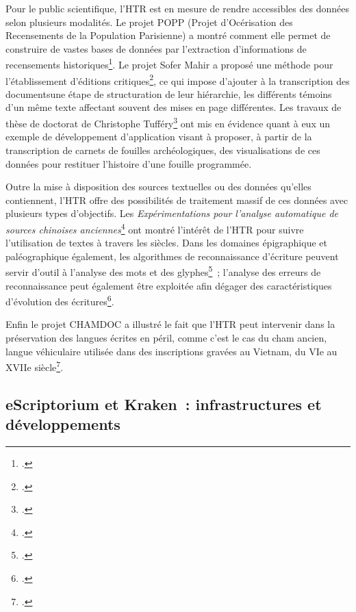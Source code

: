 \documentclass[a4paper,12pt,twoside]{book}
\begin{document}
				Pour le public scientifique, l'HTR est en mesure de rendre accessibles
				des données selon plusieurs modalités. Le projet POPP (Projet
				d'Océrisation des Recensements de la Population Parisienne) a montré
				comment elle permet de construire de vastes bases de données par
				l'extraction d'informations de recensements historiques\footcite{constumReconnaissanceExtractionInformations2022}. Le projet Sofer
				Mahir a proposé une méthode pour l'établissement d'éditions critiques\footcite{stoklbenezraHTRCriticalEdition2022}, ce qui impose d'ajouter à la
				transcription des documentsune étape de structuration de leur
				hiérarchie, les différents témoins d'un même texte affectant souvent des
				mises en page différentes. Les travaux de thèse de doctorat de
				Christophe Tufféry\footcite{tufferyRetourExperiencesUtilisation2022} ont
				mis en évidence quant à eux un exemple de développement d'application
				visant à proposer, à partir de la transcription de carnets de fouilles
				archéologiques, des visualisations de ces données pour restituer
				l'histoire d'une fouille programmée.
				
				Outre la mise à disposition des sources textuelles ou des données
				qu'elles contiennent, l'HTR offre des possibilités de traitement massif
				de ces données avec plusieurs types d'objectifs. Les
				\textit{Expérimentations pour l'analyse automatique de sources chinoises anciennes}\footcite{bizais-lilligExperimentationsPourAnalyse2022} ont
				montré l'intérêt de l'HTR pour suivre l'utilisation de textes à travers
				les siècles. Dans les domaines épigraphique et paléographique également,
				les algorithmes de reconnaissance d'écriture peuvent servir d'outil à
				l'analyse des mots et des glyphes\footcite{boschettiEpiSearchRecognisingAncient2022}~; l'analyse des erreurs de reconnaissance peut également être exploitée afin dégager des
				caractéristiques d'évolution des écritures\footcite{paraskeviHTRHandwrittenPaleographic2022}.
				
				Enfin le projet CHAMDOC a illustré le fait que l'HTR peut intervenir
				dans la préservation des langues écrites en péril, comme c'est le cas du
				cham ancien, langue véhiculaire utilisée dans des inscriptions gravées
				au Vietnam, du VIe au XVIIe siècle\footcite{schweyerAnalyseReconnaissanceIndexation2022}.
		
			\subsection{eScriptorium et Kraken~: infrastructures et développements}
			
\end{document}
